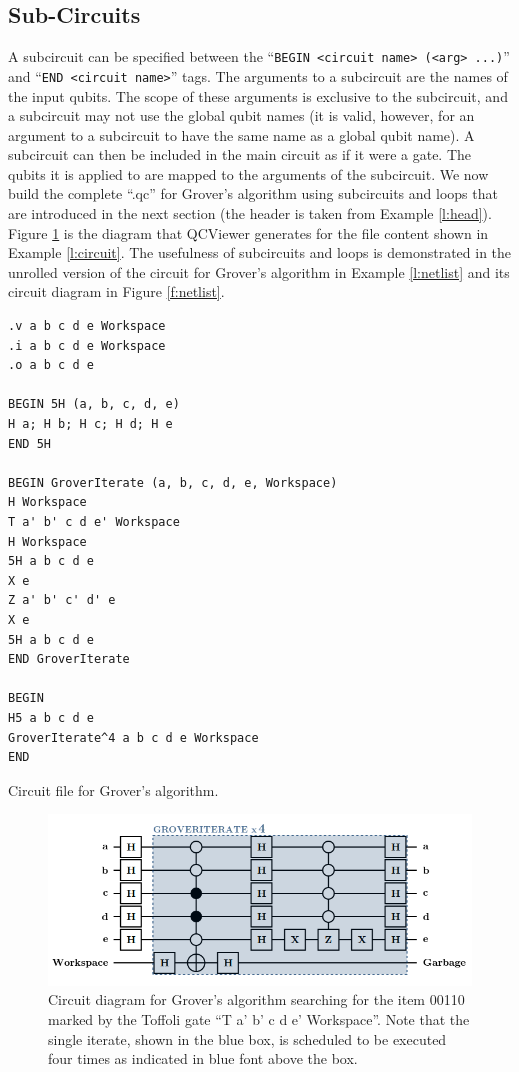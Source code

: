 \documentclass[aps,prl,reprint,floatfix,superscriptaddress]{revtex4-1} %
\begin{document}
\subsection{Sub-Circuits}
A subcircuit can be specified between the ``\verb+BEGIN <circuit name> (<arg> ...)+'' and ``\verb+END <circuit name>+'' tags. The arguments to a subcircuit are the names of the input qubits. The scope of these arguments is exclusive to the subcircuit, and a subcircuit may not use the global qubit names (it is valid, however, for an argument to a subcircuit to have the same name as a global qubit name). A subcircuit can then be included
in the main circuit as if it were a gate. The qubits it is applied to are mapped to the arguments of the subcircuit. We now build the complete ``.qc'' for Grover's algorithm 
using subcircuits and loops that are introduced in the next section (the header is taken from Example \ref{l:head}). Figure \ref{f:grover} is the diagram that QCViewer generates for the file content shown in Example \ref{l:circuit}.  The usefulness of subcircuits and loops is demonstrated in the
unrolled version of the circuit for Grover's algorithm in Example \ref{l:netlist} and its circuit diagram in Figure \ref{f:netlist}.
\begin{program}

\begin{verbatim}
.v a b c d e Workspace
.i a b c d e Workspace
.o a b c d e

BEGIN 5H (a, b, c, d, e)
H a; H b; H c; H d; H e
END 5H

BEGIN GroverIterate (a, b, c, d, e, Workspace)
H Workspace
T a' b' c d e' Workspace
H Workspace
5H a b c d e
X e
Z a' b' c' d' e
X e
5H a b c d e
END GroverIterate

BEGIN
H5 a b c d e
GroverIterate^4 a b c d e Workspace
END
\end{verbatim}
\caption{Circuit file for Grover's algorithm.}
\label{l:circuit}
\end{program}
\begin{figure}
\includegraphics[scale=0.32]{grover_circuit}
\caption{Circuit diagram for Grover's algorithm searching for the item 00110 marked by the Toffoli gate 
``T a' b' c d e' Workspace''. Note that the single iterate, shown in the blue box, is scheduled to be 
executed four times as indicated in blue font above the box.}
\label{f:grover}
\end{figure}
\end{document}
